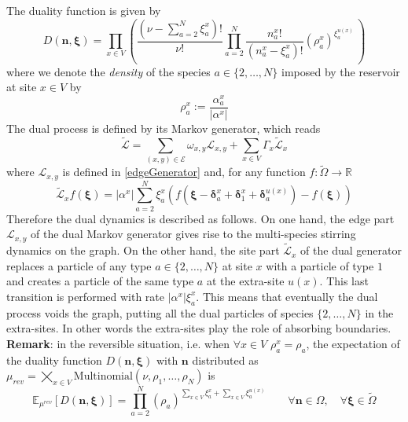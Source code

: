 \documentclass[11pt]{article}
\numberwithin{equation}{section}
\numberwithin{equation}{subsection}
\newcommand{\twoj}{\nu}
\begin{document}
The duality function is given by
\begin{equation}\label{dualityElements}
	D(\bm{n},\bm{\xi})=\prod_{x\in V}\left(\frac{(\nu -\sum_{a=2}^{N}\xi_{a}^{x})!}{\nu!}\prod_{a=2}^{N}\frac{n_{a}^{x}!}{(n_{a}^{x}-\xi_{a}^{x})!}\left(\rho_{a}^{x}\right)^{\xi_{a}^{u(x)}}\,\right)
\end{equation}
where we denote the \textit{density} of the species $a\in \{2,\ldots,N\}$ imposed by the reservoir at site $x\in V$  by 
\begin{equation}
\rho_{a}^{x}:=\frac{\alpha_{a}^{x}}{|\alpha^{x}|}
\end{equation}
The dual process is defined by its Markov generator, which reads
 \begin{equation}\label{DualGenerator}
    \widetilde{\mathcal{L}}=\sum_{(x,y)\in \mathcal{E}}\omega_{x,y}\mathcal{L}_{x,y}+\sum_{x\in V}\Gamma_{x}\widetilde{\mathcal{L}}_{x}
\end{equation}
where 
$\mathcal{L}_{x,y}$ is defined in \eqref{edgeGenerator} and, for any function $f:\widetilde{\Omega}\to \mathbb{R}$ 
\begin{equation}\label{siteDualGenerator}
    \widetilde{\mathcal{L}}_{x}f(\bm{\xi})=|\alpha^{x}|\sum_{a=2}^{N}\xi_{a}^{x}\left(f(\bm{\xi}-\bm{\delta}_{a}^{x}+\bm{\delta}_{1}^{x}+\bm{\delta}_{a}^{u(x)})-f(\bm{\xi})\right)
\end{equation}
\newline
Therefore the dual dynamics is described as follows. On one hand, the edge part $\mathcal{L}_{x,y}$ of the dual Markov generator gives rise to  the multi-species stirring dynamics on the graph. On the other hand, the site
part $\widetilde{\mathcal{L}}_{x}$ of the dual generator replaces a particle of any type $a\in\{2,\ldots,N\}$ at site $x$ with a particle of type $1$ and creates a particle of the same type $a$ at the extra-site $u(x)$. This last transition is performed with rate $|\alpha^{x}|\xi_{a}^{x}$. This means that eventually the dual process voids the graph, putting all the dual particles of species $\{2,\ldots,N\}$ in the extra-sites. In other words the extra-sites play the role of absorbing boundaries. 
\newline \newline
\textbf{Remark}: in the reversible situation, i.e. when $\forall x\in V$ $\rho_{a}^{x}=\rho_{a}$, the expectation  of the duality function  $D(\bm{n},\bm{\xi})$ with   $\bm{n}$ distributed as  $\mu_{rev} = \bigtimes_{x\in V}\text{Multinomial}\left(\twoj, \rho_{1},\ldots,\rho_{N}\right)$ is
\begin{equation}
\mathbb{E}_{\mu^{rev}}\left[D(\bm{n},\bm{\xi})\right]=\prod_{a=2}^{N}\left(\rho_{a}\right)^{\sum_{x\in V}\xi_{a}^{x}+\sum_{x\in V}\xi_{a}^{u(x)}}\qquad \forall \bm{n}\in \Omega,\quad\forall \bm{\xi}\in \widetilde{\Omega}
\end{equation}
\end{document}
